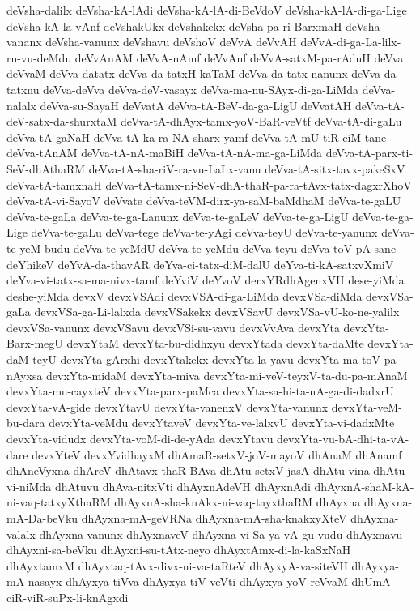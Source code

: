 {deVsha-dalilx
deVsha-kA-lAdi
deVsha-kA-lA-di-BeVdoV
deVsha-kA-lA-di-ga-Lige
deVsha-kA-la-vAnf
deVshakUkx
deVshakekx
deVsha-pa-ri-BarxmaH
deVsha-vananx
deVsha-vanunx
deVshavu
deVshoV
deVvA
deVvAH
deVvA-di-ga-La-lilx-ru-vu-deMdu
deVvAnAM
deVvA-nAmf
deVvAnf
deVvA-satxM-pa-rAduH
deVva
deVvaM
deVva-datatx
deVva-da-tatxH-kaTaM
deVva-da-tatx-nanunx
deVva-da-tatxnu
deVva-deVva
deVva-deV-vasayx
deVva-ma-nu-SAyx-di-ga-LiMda
deVva-nalalx
deVva-su-SayaH
deVvatA
deVva-tA-BeV-da-ga-LigU
deVvatAH
deVva-tA-deV-satx-da-shurxtaM
deVva-tA-dhAyx-tamx-yoV-BaR-veVtf
deVva-tA-di-gaLu
deVva-tA-gaNaH
deVva-tA-ka-ra-NA-sharx-yamf
deVva-tA-mU-tiR-ciM-tane
deVva-tAnAM
deVva-tA-nA-maBiH
deVva-tA-nA-ma-ga-LiMda
deVva-tA-parx-ti-SeV-dhAthaRM
deVva-tA-sha-riV-ra-vu-LaLx-vanu
deVva-tA-sitx-tavx-pakeSxV
deVva-tA-tamxnaH
deVva-tA-tamx-ni-SeV-dhA-thaR-pa-ra-tAvx-tatx-dagxrXhoV
deVva-tA-vi-SayoV
deVvate
deVva-teVM-dirx-ya-saM-baMdhaM
deVva-te-gaLU
deVva-te-gaLa
deVva-te-ga-Lanunx
deVva-te-gaLeV
deVva-te-ga-LigU
deVva-te-ga-Lige
deVva-te-gaLu
deVva-tege
deVva-te-yAgi
deVva-teyU
deVva-te-yanunx
deVva-te-yeM-budu
deVva-te-yeMdU
deVva-te-yeMdu
deVva-teyu
deVva-toV-pA-sane
deYhikeV
deYvA-da-thavAR
deYva-ci-tatx-diM-dalU
deYva-ti-kA-satxvXmiV
deYva-vi-tatx-sa-ma-nivx-tamf
deYviV
deYvoV
derxYRdhAgenxVH
dese-yiMda
deshe-yiMda
devxV
devxVSAdi
devxVSA-di-ga-LiMda
devxVSa-diMda
devxVSa-gaLa
devxVSa-ga-Li-lalxda
devxVSakekx
devxVSavU
devxVSa-vU-ko-ne-yalilx
devxVSa-vanunx
devxVSavu
devxVSi-su-vavu
devxVvAva
devxYta
devxYta-Barx-megU
devxYtaM
devxYta-bu-didhxyu
devxYtada
devxYta-daMte
devxYta-daM-teyU
devxYta-gArxhi
devxYtakekx
devxYta-la-yavu
devxYta-ma-toV-pa-nAyxsa
devxYta-midaM
devxYta-miva
devxYta-mi-veV-teyxV-ta-du-pa-mAnaM
devxYta-mu-cayxteV
devxYta-parx-paMca
devxYta-sa-hi-ta-nA-ga-di-dadxrU
devxYta-vA-gide
devxYtavU
devxYta-vanenxV
devxYta-vanunx
devxYta-veM-bu-dara
devxYta-veMdu
devxYtaveV
devxYta-ve-lalxvU
devxYta-vi-dadxMte
devxYta-vidudx
devxYta-voM-di-de-yAda
devxYtavu
devxYta-vu-bA-dhi-ta-vA-dare
devxYteV
devxYvidhayxM
dhAmaR-setxV-joV-mayoV
dhAnaM
dhAnamf
dhAneVyxna
dhAreV
dhAtavx-thaR-BAva
dhAtu-setxV-jasA
dhAtu-vina
dhAtu-vi-niMda
dhAtuvu
dhAva-nitxVti
dhAyxnAdeVH
dhAyxnAdi
dhAyxnA-shaM-kA-ni-vaq-tatxyXthaRM
dhAyxnA-sha-knAkx-ni-vaq-tayxthaRM
dhAyxna
dhAyxna-mA-Da-beVku
dhAyxna-mA-geVRNa
dhAyxna-mA-sha-knakxyXteV
dhAyxna-valalx
dhAyxna-vanunx
dhAyxnaveV
dhAyxna-vi-Sa-ya-vA-gu-vudu
dhAyxnavu
dhAyxni-sa-beVku
dhAyxni-su-tAtx-neyo
dhAyxtAmx-di-la-kaSxNaH
dhAyxtamxM
dhAyxtaq-tAvx-divx-ni-va-taRteV
dhAyxyA-va-siteVH
dhAyxya-mA-nasayx
dhAyxya-tiVva
dhAyxya-tiV-veVti
dhAyxya-yoV-reVvaM
dhUmA-ciR-viR-suPx-li-knAgxdi
}
